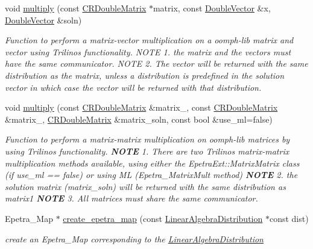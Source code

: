 \begin{DoxyCompactItemize}
void \hyperlink{namespaceoomph_1_1TrilinosEpetraHelpers_a595c337ff02ad53b3dcac04ed142f8db}{multiply} (const \hyperlink{classoomph_1_1CRDoubleMatrix}{C\+R\+Double\+Matrix} $\ast$matrix, const \hyperlink{classoomph_1_1DoubleVector}{Double\+Vector} \&x, \hyperlink{classoomph_1_1DoubleVector}{Double\+Vector} \&soln)
\begin{DoxyCompactList}\small\item\em Function to perform a matrix-\/vector multiplication on a oomph-\/lib matrix and vector using Trilinos functionality. N\+O\+TE 1. the matrix and the vectors must have the same communicator. N\+O\+TE 2. The vector will be returned with the same distribution as the matrix, unless a distribution is predefined in the solution vector in which case the vector will be returned with that distribution. \end{DoxyCompactList}\item 
void \hyperlink{namespaceoomph_1_1TrilinosEpetraHelpers_a0d96936ed1e5f3266ef06564ae300103}{multiply} (const \hyperlink{classoomph_1_1CRDoubleMatrix}{C\+R\+Double\+Matrix} \&matrix\+\_, const \hyperlink{classoomph_1_1CRDoubleMatrix}{C\+R\+Double\+Matrix} \&matrix\+\_, \hyperlink{classoomph_1_1CRDoubleMatrix}{C\+R\+Double\+Matrix} \&matrix\+\_\+soln, const bool \&use\+\_\+ml=false)
\begin{DoxyCompactList}\small\item\em Function to perform a matrix-\/matrix multiplication on oomph-\/lib matrices by using Trilinos functionality. {\bfseries N\+O\+TE} 1. There are two Trilinos matrix-\/matrix multiplication methods available, using either the Epetra\+Ext\+::\+Matrix\+Matrix class (if use\+\_\+ml == false) or using ML (Epetra\+\_\+\+Matrix\+Mult method) {\bfseries N\+O\+TE} 2. the solution matrix (matrix\+\_\+soln) will be returned with the same distribution as matrix1 {\bfseries N\+O\+TE} 3. All matrices must share the same communicator. \end{DoxyCompactList}\item 
Epetra\+\_\+\+Map $\ast$ \hyperlink{namespaceoomph_1_1TrilinosEpetraHelpers_a5ccd0dec0ba044834119416b0ed06a2f}{create\+\_\+epetra\+\_\+map} (const \hyperlink{classoomph_1_1LinearAlgebraDistribution}{Linear\+Algebra\+Distribution} $\ast$const dist)
\begin{DoxyCompactList}\small\item\em create an Epetra\+\_\+\+Map corresponding to the \hyperlink{classoomph_1_1LinearAlgebraDistribution}{Linear\+Algebra\+Distribution} \end{DoxyCompactList}\end{DoxyCompactItemize}


